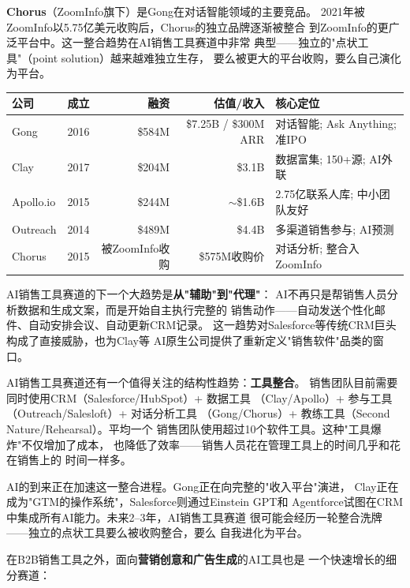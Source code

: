 \textbf{Chorus}（ZoomInfo旗下）是Gong在对话智能领域的主要竞品。
2021年被ZoomInfo以5.75亿美元收购后，Chorus的独立品牌逐渐被整合
到ZoomInfo的更广泛平台中。这一整合趋势在AI销售工具赛道中非常
典型——独立的"点状工具"（point solution）越来越难独立生存，
要么被更大的平台收购，要么自己演化为平台。

\begin{keybox}[AI销售与营销工具赛道全景]
\small
\begin{tabularx}{\textwidth}{l c r r X}
\toprule
\rowcolor{figLightGray}
\textbf{公司} & \textbf{成立} & \textbf{融资}
  & \textbf{估值/收入} & \textbf{核心定位} \\
\midrule
Gong        & 2016 & \$584M
  & \$7.25B / \$300M ARR & 对话智能; Ask Anything; 准IPO \\
Clay        & 2017 & \$204M
  & \$3.1B & 数据富集; 150+源; AI外联 \\
Apollo.io   & 2015 & \$244M
  & $\sim$\$1.6B & 2.75亿联系人库; 中小团队友好 \\
Outreach    & 2014 & \$489M
  & \$4.4B & 多渠道销售参与; AI预测 \\
Chorus      & 2015 & 被ZoomInfo收购
  & \$575M收购价 & 对话分析; 整合入ZoomInfo \\
\bottomrule
\end{tabularx}

\medskip
\noindent AI销售工具赛道的下一个大趋势是\textbf{从"辅助"到"代理"}：
AI不再只是帮销售人员分析数据和生成文案，而是开始自主执行完整的
销售动作——自动发送个性化邮件、自动安排会议、自动更新CRM记录。
这一趋势对Salesforce等传统CRM巨头构成了直接威胁，也为Clay等
AI原生公司提供了重新定义"销售软件"品类的窗口。
\end{keybox}

AI销售工具赛道还有一个值得关注的结构性趋势：\textbf{工具整合}。
销售团队目前需要同时使用CRM（Salesforce/HubSpot）+ 数据工具
（Clay/Apollo）+ 参与工具（Outreach/Salesloft）+ 对话分析工具
（Gong/Chorus）+ 教练工具（Second Nature/Rehearsal）。平均一个
销售团队使用超过10个软件工具。这种"工具爆炸"不仅增加了成本，
也降低了效率——销售人员花在管理工具上的时间几乎和花在销售上的
时间一样多。

AI的到来正在加速这一整合进程。Gong正在向完整的"收入平台"演进，
Clay正在成为"GTM的操作系统"，Salesforce则通过Einstein GPT和
Agentforce试图在CRM中集成所有AI能力。未来2--3年，AI销售工具赛道
很可能会经历一轮整合洗牌——独立的点状工具要么被收购整合，要么
自我进化为平台。

在B2B销售工具之外，面向\textbf{营销创意和广告生成}的AI工具也是
一个快速增长的细分赛道：

